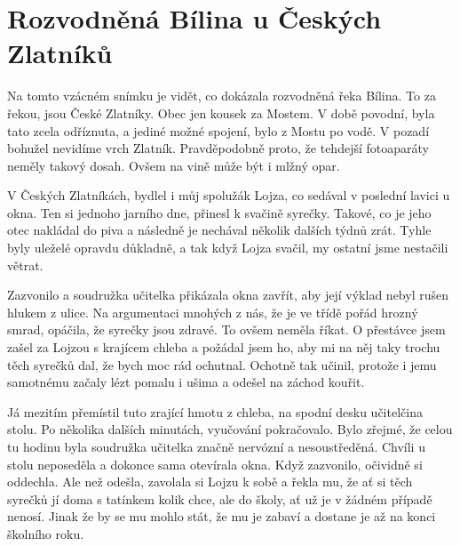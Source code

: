 
\chapter{Rozvodněná Bílina u Českých Zlatníků}

Na tomto vzácném snímku je vidět, co dokázala rozvodněná řeka Bílina. To za
řekou, jsou České Zlatníky. Obec jen kousek za Mostem. V době povodní, byla
tato zcela odříznuta, a jediné možné spojení, bylo z Mostu po vodě. V pozadí
bohužel nevidíme vrch Zlatník. Pravděpodobně proto, že tehdejší fotoaparáty
neměly takový dosah. Ovšem na vině může být i mlžný opar.

V Českých Zlatníkách, bydlel i můj spolužák Lojza, co sedával v poslední lavici
u okna. Ten si jednoho jarního dne, přinesl k svačině syrečky. Takové, co je
jeho otec nakládal do piva a následně je nechával několik dalších týdnů zrát.
Tyhle byly uleželé opravdu důkladně, a tak když Lojza svačil, my ostatní jsme
nestačili větrat.

Zazvonilo a soudružka učitelka přikázala okna zavřít, aby její výklad nebyl
rušen hlukem z ulice. Na argumentaci mnohých z nás, že je ve třídě pořád hrozný
smrad, opáčila, že syrečky jsou zdravé. To ovšem neměla říkat. O přestávce jsem
zašel za Lojzou s krajícem chleba a požádal jsem ho, aby mi na něj taky trochu
těch syrečků dal, že bych moc rád ochutnal. Ochotně tak učinil, protože i jemu
samotnému začaly lézt pomalu i ušima a odešel na záchod kouřit.

Já mezitím přemístil tuto zrající hmotu z chleba, na spodní desku učitelčina
stolu. Po několika dalších minutách, vyučování pokračovalo. Bylo zřejmé, že
celou tu hodinu byla soudružka učitelka značně nervózní a nesoustředěná. Chvíli
u stolu neposeděla a dokonce sama otevírala okna. Když zazvonilo, očividně si
oddechla. Ale než odešla, zavolala si Lojzu k sobě a řekla mu, že ať si těch
syrečků jí doma s tatínkem kolik chce, ale do školy, ať už je v žádném případě
nenosí. Jinak že by se mu mohlo stát, že mu je zabaví a dostane je až na konci
školního roku.


